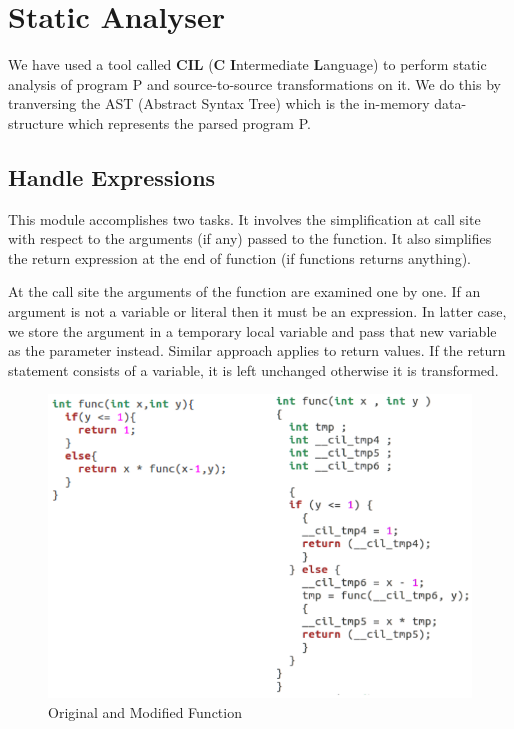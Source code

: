 \documentclass[12pt,oneside]{book}
\begin{document}
\section{Static Analyser}
We have used a tool called \textbf{CIL} (\textbf{C} \textbf{I}ntermediate \textbf{L}anguage) to perform static analysis of program P and source-to-source transformations on it. We do this by tranversing the AST (Abstract Syntax Tree) which is the in-memory data-structure which represents the parsed program P.

\subsection{Handle Expressions}

This module accomplishes two tasks. It involves the simplification at call site with respect to the arguments (if any) passed to the function. It also simplifies the return expression at the end of function (if functions returns anything). 

At the call site the arguments of the function are examined one by one. If an argument is not a variable or literal then it must be an expression. In latter case, we store the argument in a temporary local variable and pass that new variable as the parameter instead. Similar approach applies to return values. If the return statement consists of a variable, it is left unchanged otherwise it is transformed.\\

\begin{figure}[htbp]
\centering
\includegraphics[scale=0.55]{handleExp3.png}
\caption{Original and Modified Function}
\end{figure}  
\end{document}
